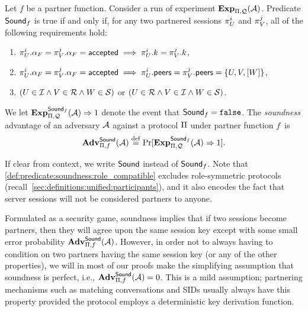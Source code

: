 \begin{definition}\label{def:predicate:soundness}
Let $f$ be a partner function.
Consider a run of experiment $\mathbf{Exp}_{\mathrm{\Pi},\mathcal{Q}}^{}(\mathcal{A})$.
Predicate $\mathsf{Sound}_f$ is true if and only if,
for any two partnered sessions $\oracle[U][i]$ and $\oracle[V][j]$,
all of the following requirements hold:
\begin{enumerate}
	\item $\oracle[U][i].\runstate_F = \oracle[V][j].\runstate_F = \accepted \implies \oracle[U][i].\key = \oracle[V][j].\key$,
	
	\item $\oracle[U][i].\runstate_F = \oracle[V][j].\runstate_F = \accepted \implies \oracle[U][i].\peers = \oracle[V][j].\peers = \lbrace U, V, [W] \rbrace$,
	
	\item\label{def:predicate:soundness:role_compatible} $\left( U \in \mathcal{I} \land V \in \mathcal{R} \land W \in \mathcal{S} \right)$ or $\left(U \in \mathcal{R} \land V \in \mathcal{I} \land W \in \mathcal{S} \right)$.
	
	
\end{enumerate}

We let $\mathbf{Exp}_{\mathrm{\Pi},\mathcal{Q}}^{\mathsf{Sound}_f}(\mathcal{A}) \Rightarrow 1$ denote the event that $\mathsf{Sound}_f = \mathtt{false}$.
The \emph{soundness} advantage of an adversary $\mathcal{A}$ against a protocol $\mathrm{\Pi}$ under partner function $f$~is 
\begin{equation}
	\mathbf{Adv}_{\mathrm{\Pi},f}^{\mathsf{Sound}}(\mathcal{A}) \overset{\mathrm{def}}{=}  \Pr[\mathbf{Exp}_{\mathrm{\Pi},\mathcal{Q}}^{\mathsf{Sound}_f}(\mathcal{A}) \Rightarrow 1] .
\end{equation} 

\end{definition}
\smallskip

If clear from context,
we write $\mathsf{Sound}$ instead of $\mathsf{Sound}_f$. 
Note that \cref{def:predicate:soundness:role_compatible} excludes role-symmetric protocols (recall~\cref{sec:definitions:unified:participants}),
and it also encodes the fact that server sessions will not be considered partners to anyone. 

Formulated as a security game,
soundness implies that if two sessions become partners,
then they will agree upon the same session key  except with some small error probability $\mathbf{Adv}_{\mathrm{\Pi},f}^{\mathsf{Sound}}(\mathcal{A})$.
However,
in order not to always having to condition on two partners having the same session key
(or any of the other properties),
we will in most of our proofs make the simplifying assumption that soundness is perfect,
i.e., $\mathbf{Adv}_{\mathrm{\Pi},f}^{\mathsf{Sound}}(\mathcal{A}) = 0$.
This is a mild assumption;
partnering mechanisms such as matching conversations and SIDs usually always have this property provided the protocol employs a deterministic key derivation function.


